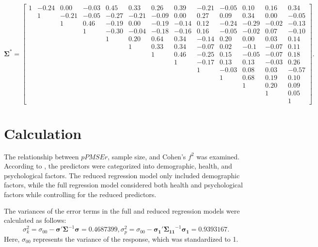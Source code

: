  \scriptsize{
\begin{equation}\label{eq:Sigma}
\bm{\Sigma}^* =
\left[\begin{array}{ccccccccccccc}
  1&   -0.24& 0.00 &-0.03& 0.45 &0.33 &0.26& 0.39 &-0.21& -0.05& 0.10& 0.16 &0.34\\
  &1 &-0.21& -0.05 &-0.27 &-0.21& -0.09& 0.00 &0.27& 0.09 &0.34& 0.00 &-0.05 \\
  & & 1&0.46& -0.19& 0.00& -0.19 &-0.14 &0.12& -0.24 &-0.29& -0.02& -0.13\\
  & & & 1&-0.30& -0.04 &-0.18& -0.16& 0.16 &-0.05& -0.02& 0.07& -0.10 \\
  & & & & 1&0.20& 0.64 &0.34 &-0.14& 0.20& 0.00 &0.03& 0.14 \\
  & & & & & 1&0.33 &0.34& -0.07 &0.02& -0.1& -0.07& 0.11\\
  & & & & & & 1& 0.46& -0.25 &0.15& -0.05 &-0.07 &0.18\\
  & & & & & & & 1&-0.17& 0.13& 0.13 &-0.03& 0.26\\
  & & & & & & & & 1& -0.03 &0.08 &0.03 &-0.57\\
  & & & & & & & & & 1&0.68 &0.19& 0.10\\
  & & & & & & & & & & 1&0.20 &0.09\\
  & & & & & & & & & & & 1& 0.05\\
 & & & & & & & & & & & &1
 \end{array}\right].
 \end{equation}
 }
 \normalsize


\section{Calculation}

The relationship between $pPMSEr$, sample size, and Cohen's $f^2$ was examined. According to \cite{baker2008chronicpain}, the predictors were categorized into demographic, health, and psychological factors. The reduced regression model only included demographic factors, while the full regression model considered both health and psychological factors while controlling for the reduced predictors.
  
 The variances of the error terms in the full and reduced regression models were calculated as follows: $$\sigma^2_k = \sigma_{00} - \boldsymbol{\sigma}' \boldsymbol{\Sigma}^{-1} \boldsymbol{\sigma} = 0.4687399,\sigma^2_p = \sigma_{00} - \boldsymbol{\sigma_1}' \boldsymbol{\Sigma_{11}}^{-1} \boldsymbol{\sigma_1} = 0.9393167.$$ Here, $\sigma_{00}$ represents the variance of the response, which was standardized to 1.



